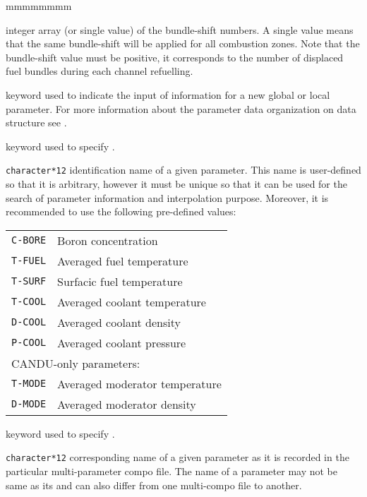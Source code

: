 \begin{ListeDeDescription}{mmmmmmmm}
\item[\dusa{ishift}] integer array (or single value) of the bundle-shift numbers.
A single  value means that the same bundle-shift will be applied for
all combustion zones. Note that the bundle-shift value must be positive, it
corresponds to the number of displaced fuel bundles during each channel refuelling.

\item[\moc{ADD-PARAM}] keyword used to indicate the input of information
for a new global or local parameter. For more information about the parameter
data organization on  data structure see .

\item[\moc{PNAME}] keyword used to specify .

\item[\dusa{PNAME}] \texttt{character*12} identification name of a given
parameter. This name is user-defined so that it is arbitrary, however
it must be unique so that it can be used for the search of parameter information
and interpolation purpose. Moreover, it is recommended to use the following pre-defined
values:

\begin{tabular}{|c|l|}
\hline
{\tt C-BORE} & Boron concentration \\
{\tt T-FUEL} & Averaged fuel temperature \\
{\tt T-SURF} & Surfacic fuel temperature \\
{\tt T-COOL} & Averaged coolant temperature \\
{\tt D-COOL} & Averaged coolant density \\
{\tt P-COOL} & Averaged coolant pressure\\
\hline
\multicolumn{2}{|l|}{CANDU-only parameters:} \\
\hline
{\tt T-MODE} & Averaged moderator temperature\\
{\tt D-MODE} & Averaged moderator density \\
\hline
\end{tabular}

\item[\moc{PARKEY}] keyword used to specify .

\item[\dusa{PARKEY}] \texttt{character*12} corresponding name of a given
parameter as it is recorded in the particular multi-parameter compo file. The
 name of a parameter may not be same as its 
and can also differ from one multi-compo file to another.


\end{ListeDeDescription}

